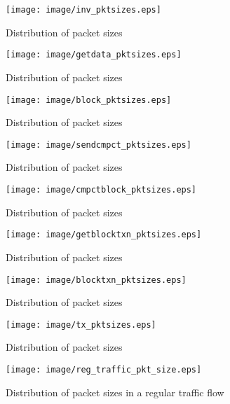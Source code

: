 \begin{figure}
\centering
\texttt{[image: image/inv\_pktsizes.eps]}
\caption{Distribution of  packet sizes}
\label{fig:inv_pktsizes}
\end{figure}

\begin{figure}
\centering
\texttt{[image: image/getdata\_pktsizes.eps]}
\caption{Distribution of  packet sizes}
\label{fig:getdata_pktsizes}
\end{figure}


\begin{figure}
\centering
\texttt{[image: image/block\_pktsizes.eps]}
\caption{Distribution of  packet sizes}
\label{fig:block_pktsizes}
\end{figure}

\begin{figure}
\centering
\texttt{[image: image/sendcmpct\_pktsizes.eps]}
\caption{Distribution of  packet sizes}
\label{fig:sendcmpct_pktsizes}
\end{figure}

\begin{figure}
\centering
\texttt{[image: image/cmpctblock\_pktsizes.eps]}
\caption{Distribution of  packet sizes}
\label{fig:cmpctblock_pktsizes}
\end{figure}

\begin{figure}
\centering
\texttt{[image: image/getblocktxn\_pktsizes.eps]}
\caption{Distribution of  packet sizes}
\label{fig:getblocktxn_pktsizes}
\end{figure}

\begin{figure}
\centering
\texttt{[image: image/blocktxn\_pktsizes.eps]}
\caption{Distribution of  packet sizes}
\label{fig:blocktxn_pktsizes}
\end{figure}


\begin{figure}
\centering
\texttt{[image: image/tx\_pktsizes.eps]}
\caption{Distribution of  packet sizes}
\label{fig:tx_pktsizes}
\end{figure}


\begin{figure}
\centering
\texttt{[image: image/reg\_traffic\_pkt\_size.eps]}
\caption{Distribution of packet sizes in a regular traffic flow}
\label{fig:reg_traffic_pkt_size}
\end{figure}